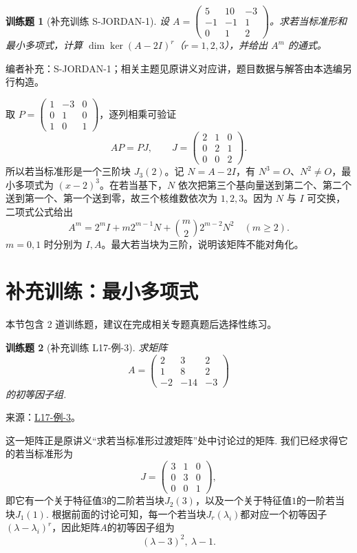 \documentclass[12pt,fontset=fandol]{ctexart}
\newtheorem{exercise}{训练题}[section]
\begin{document}
\begin{exercise}[补充训练 S-JORDAN-1]\label{prob:S-JORDAN-1}
设 $A=\begin{pmatrix}5&10&-3\\-1&-1&1\\0&1&2\end{pmatrix}$。求若当标准形和最小多项式，计算 $\dim\ker(A-2I)^r$（$r=1,2,3$），并给出 $A^m$ 的通式。
\end{exercise}
\noindent 编者补充：S-JORDAN-1；相关主题见原讲义对应讲，题目数据与解答由本选编另行构造。
\begin{solve}
取 $P=\begin{pmatrix}1&-3&0\\0&1&0\\1&0&1\end{pmatrix}$，逐列相乘可验证
\[AP=PJ,\qquad J=\begin{pmatrix}2&1&0\\0&2&1\\0&0&2\end{pmatrix}.\]
所以若当标准形是一个三阶块 $J_3(2)$。记 $N=A-2I$，有 $N^3=O$、$N^2\ne O$，最小多项式为 $(x-2)^3$。在若当基下，$N$ 依次把第三个基向量送到第二个、第二个送到第一个、第一个送到零，故三个核维数依次为 $1,2,3$。因为 $N$ 与 $I$ 可交换，二项式公式给出
\[A^m=2^mI+m2^{m-1}N+\binom m22^{m-2}N^2\quad(m\ge2).\]
$m=0,1$ 时分别为 $I,A$。最大若当块为三阶，说明该矩阵不能对角化。
\end{solve}

\section{补充训练：最小多项式}

本节包含 2 道训练题，建议在完成相关专题真题后选择性练习。

\begin{exercise}[补充训练 L17-例-3]\label{prob:L17-例-3}
求矩阵
    \[
        A=\begin{pmatrix}
                2 & 3 & 2 \\
                1 & 8 & 2 \\
                -2 & -14 & -3
            \end{pmatrix}
    \]
    的初等因子组.
\end{exercise}
\noindent 来源：\href{https://github.com/yhwu-is/Linear-Algebra-Left-Undone/blob/new/%E8%AE%B2%E4%B9%89/%E4%B8%93%E9%A2%98/17%20%E5%A4%9A%E9%A1%B9%E5%BC%8F%E7%9A%84%E8%BF%9B%E4%B8%80%E6%AD%A5%E8%AE%A8%E8%AE%BA.tex}{L17-例-3}。
\begin{solve}
这一矩阵正是原讲义“求若当标准形过渡矩阵”处中讨论过的矩阵. 我们已经求得它的若当标准形为
    \[
        J=\begin{pmatrix}
                3 & 1 & 0 \\
                0 & 3 & 0 \\
                0 & 0 & 1
            \end{pmatrix},
    \]
    即它有一个关于特征值$3$的二阶若当块$J_2(3)$，以及一个关于特征值$1$的一阶若当块$J_1(1)$. 根据前面的讨论可知，每一个若当块$J_r(\lambda_i)$都对应一个初等因子$(\lambda-\lambda_i)^r$，因此矩阵$A$的初等因子组为
    \[
        (\lambda-3)^2,\ \lambda-1.
    \]
\end{solve}
\end{document}
